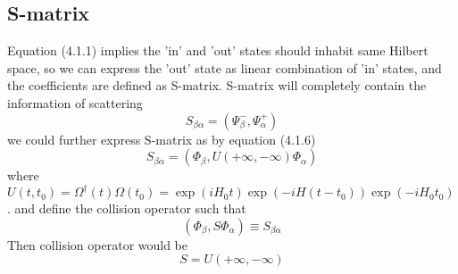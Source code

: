 \documentclass[12pt]{article}
\numberwithin{equation}{subsection}
\begin{document}
\subsection{S-matrix}
Equation (4.1.1) implies the 'in' and 'out' states should inhabit same Hilbert space, so we can express the 'out' state as linear combination of 'in' states, and the coefficients are defined as S-matrix.
S-matrix will completely contain the information of scattering
\begin{equation}
    S_{\beta\alpha} = \left(\Psi_{\beta}^{-}, \Psi_{\alpha}^{+}\right)
\end{equation}
we could further express S-matrix as by equation (4.1.6)
\begin{equation}
    S_{\beta\alpha} = \left(\Phi_{\beta}, U(+\infty, -\infty)\Phi_{\alpha}\right)
\end{equation}
where $U(t, t_0) = \Omega^{\dagger}(t)\Omega(t_0) = \exp(iH_0t)\exp(-iH(t-t_0))\exp(-iH_0t_0)$.
and define the collision operator such that 
\begin{equation}
    \left(\Phi_{\beta}, S\Phi_{\alpha}\right) \equiv S_{\beta\alpha}
\end{equation}
Then collision operator would be
\begin{equation}
    S=U(+\infty, -\infty)
\end{equation}
\end{document}
